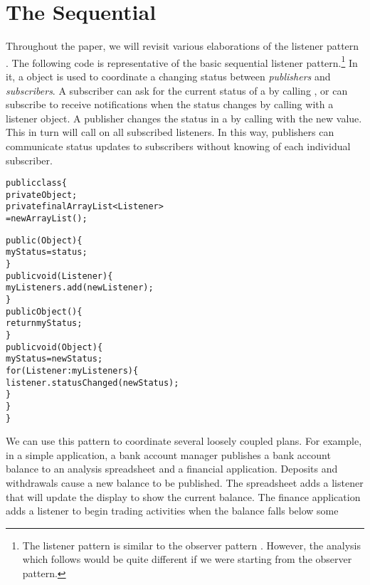 \documentclass{llncs}
\begin{document}
\section{The Sequential }

Throughout the paper, we will revisit various elaborations of the
listener pattern \cite{Englander:beans}. The following code is
representative of the basic sequential listener pattern.\footnote{
%
The listener pattern \cite{Englander:beans} is similar to the observer
pattern \cite{gamma:patterns}. However, the analysis which follows
would be quite different if we were starting from the observer
pattern.}
%
In it, a  object is used to coordinate a changing
status between \emph{publishers} and \emph{subscribers}.  A subscriber
can ask for the current status of a  by calling
, or can subscribe to receive notifications when the
status changes by calling  with a listener object.
A publisher changes the status in a  by calling
 with the new value.  This in turn will call
 on all subscribed listeners.  In this way,
publishers can communicate status updates to subscribers without
knowing of each individual subscriber.
%
\begin{alltt}
    public class  \{
        private Object ;
        private final ArrayList<Listener>  
                          = new ArrayList();

        public (Object ) \{
            myStatus = status;
        \}
        public void (Listener ) \{
            myListeners.add(newListener);
        \}
        public Object () \{
            return myStatus; 
        \}
        public void (Object ) \{
            myStatus = newStatus;
            for (Listener : myListeners) \{
                listener.statusChanged(newStatus);
            \}
        \}
    \}
\end{alltt}
%
We can use this pattern to coordinate several loosely coupled
plans. For example, in a simple application, a bank account manager
publishes a bank account balance to an analysis spreadsheet and a
financial application.  Deposits and withdrawals cause a new balance
to be published.  The spreadsheet adds a listener that will update the
display to show the current balance. The finance application adds a
listener to begin trading activities when the balance falls below some
\end{document}
